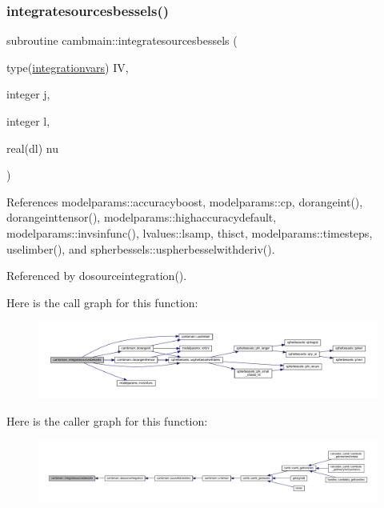 \subsubsection{\texorpdfstring{integratesourcesbessels()}{integratesourcesbessels()}}
{\footnotesize\ttfamily subroutine cambmain\+::integratesourcesbessels (\begin{DoxyParamCaption}\item[{type(\mbox{\hyperlink{structcambmain_1_1integrationvars}{integrationvars}})}]{IV,  }\item[{integer}]{j,  }\item[{integer}]{l,  }\item[{real(dl)}]{nu }\end{DoxyParamCaption})\hspace{0.3cm}{\ttfamily [private]}}



References modelparams\+::accuracyboost, modelparams\+::cp, dorangeint(), dorangeinttensor(), modelparams\+::highaccuracydefault, modelparams\+::invsinfunc(), lvalues\+::lsamp, thisct, modelparams\+::timesteps, uselimber(), and spherbessels\+::uspherbesselwithderiv().



Referenced by dosourceintegration().

Here is the call graph for this function\+:
\nopagebreak
\begin{figure}[H]
\begin{center}
\leavevmode
\includegraphics[width=350pt]{namespacecambmain_a74b9c41eb2501d8c0cc163ff7030a926_cgraph}
\end{center}
\end{figure}
Here is the caller graph for this function\+:
\nopagebreak
\begin{figure}[H]
\begin{center}
\leavevmode
\includegraphics[width=350pt]{namespacecambmain_a74b9c41eb2501d8c0cc163ff7030a926_icgraph}
\end{center}
\end{figure}
\mbox{\label{namespacecambmain_af5b8d9ce147ddcd3fb33ee015b43b284}} 

